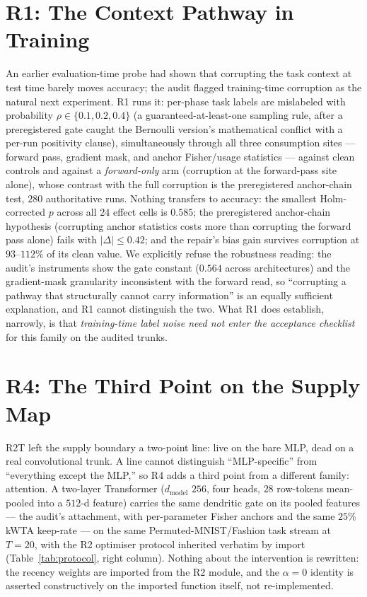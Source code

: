\documentclass[10pt]{article}
\begin{document}
\section{R1: The Context Pathway in Training}
\label{sec:r1}

An earlier evaluation-time probe had shown that corrupting the task context
at test time barely moves accuracy; the audit flagged training-time
corruption as the natural next experiment. R1 runs it: per-phase task
labels are mislabeled with probability $\rho\in\{0.1,0.2,0.4\}$
(a guaranteed-at-least-one sampling rule, after a preregistered gate caught
the Bernoulli version's mathematical conflict with a per-run positivity
clause), simultaneously through all three consumption sites --- forward
pass, gradient mask, and anchor Fisher/usage statistics --- against clean
controls and against a \emph{forward-only} arm (corruption at the
forward-pass site alone), whose contrast with the full corruption is the
preregistered anchor-chain test, $280$ authoritative runs. Nothing
transfers to accuracy: the
smallest Holm-corrected $p$ across all $24$ effect cells is $0.585$; the
preregistered anchor-chain hypothesis (corrupting anchor statistics costs
more than corrupting the forward pass alone) fails with
$|\Delta|\le0.42$; and the repair's bias gain survives corruption at
$93$--$112\%$ of its clean value. We explicitly refuse the robustness
reading: the audit's instruments show the gate constant ($0.564$ across
architectures) and the gradient-mask granularity inconsistent with the
forward read, so ``corrupting a pathway that structurally cannot carry
information'' is an equally sufficient explanation, and R1 cannot
distinguish the two. What R1 does establish, narrowly, is that
\emph{training-time label noise need not enter the acceptance checklist}
for this family on the audited trunks.

\section{R4: The Third Point on the Supply Map}
\label{sec:r4}

R2T left the supply boundary a two-point line: live on the bare MLP, dead
on a real convolutional trunk. A line cannot distinguish ``MLP-specific''
from ``everything except the MLP,'' so R4 adds a third point from a
different family: attention. A two-layer Transformer ($d_{\mathrm{model}}$
$256$, four heads, $28$ row-tokens mean-pooled into a $512$-d feature)
carries the same dendritic gate on its pooled features --- the audit's
attachment, with per-parameter Fisher anchors and the same $25\%$ kWTA
keep-rate --- on the same Permuted-MNIST/Fashion task stream at $T{=}20$,
with the R2 optimiser protocol inherited verbatim by import
(Table~\ref{tab:protocol}, right column). Nothing about the intervention
is rewritten: the recency weights are imported from the R2 module, and the
$\alpha{=}0$ identity is asserted constructively on the imported function
itself, not re-implemented.
\end{document}
